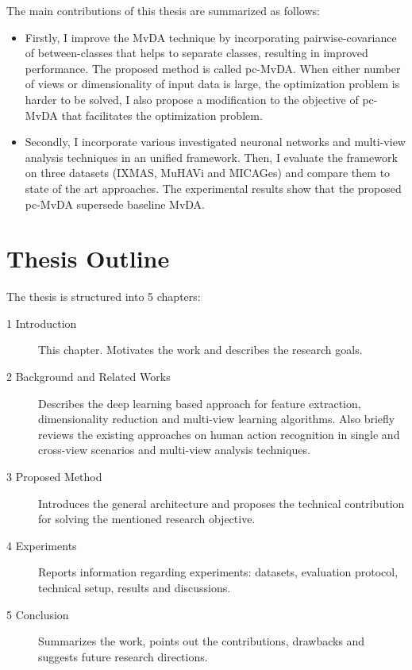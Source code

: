         The main contributions of this thesis are summarized as follows: 
        \begin{itemize}
            \item Firstly, I improve the MvDA technique by incorporating pairwise-covariance of between-classes that helps to separate classes, resulting in improved performance. The proposed method is called pc-MvDA. When either number of views or dimensionality of input data is large, the optimization problem is harder to be solved, I also propose a modification to the objective of pc-MvDA that facilitates the optimization problem.
            \item Secondly, I incorporate various investigated neuronal networks and multi-view analysis techniques in an unified framework. Then, I evaluate the framework on three datasets (IXMAS, MuHAVi and MICAGes) and compare them to state of the art approaches. The experimental results show that the proposed pc-MvDA supersede baseline MvDA.
        \end{itemize}

    \section{Thesis Outline} \label{sec:intro_outline}
        The thesis is structured into 5 chapters:
        \begin{description}
            \item[1 Introduction] This chapter. Motivates the work and describes the research goals.
            \item[2 Background and Related Works] Describes the deep learning based approach for feature extraction, dimensionality reduction and multi-view learning algorithms. Also briefly reviews the existing approaches on human action recognition in single and cross-view scenarios and multi-view analysis techniques.
            \item[3 Proposed Method] Introduces the general architecture and proposes the technical contribution for solving the mentioned research objective.
            \item[4 Experiments] Reports information regarding experiments: datasets, evaluation protocol, technical setup, results and discussions.
            \item[5 Conclusion] Summarizes the work, points out the contributions, drawbacks and suggests future research directions.
        \end{description}
